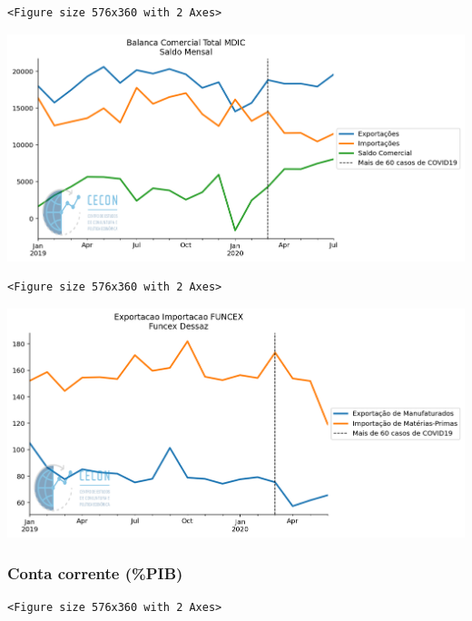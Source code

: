 \documentclass[11pt]{article}
\begin{document}
\begin{verbatim}
<Figure size 576x360 with 2 Axes>
\end{verbatim}


\begin{center}
\includegraphics[width=.9\linewidth]{obipy-resources/62e383af79e91b63c7fc98dd7fb55b3c3ececcb9/cc881955cf4dd79046a9ddaba863ddd499bf2f9a.png}
\end{center}


\begin{verbatim}
<Figure size 576x360 with 2 Axes>
\end{verbatim}


\begin{center}
\includegraphics[width=.9\linewidth]{obipy-resources/62e383af79e91b63c7fc98dd7fb55b3c3ececcb9/650e18211ef6f97bf0f8524555fb7cea6542f458.png}
\end{center}


\subsubsection{Conta corrente (\%PIB)}
\label{sec:org8f8e659}

\begin{verbatim}
<Figure size 576x360 with 2 Axes>
\end{verbatim}
\end{document}
